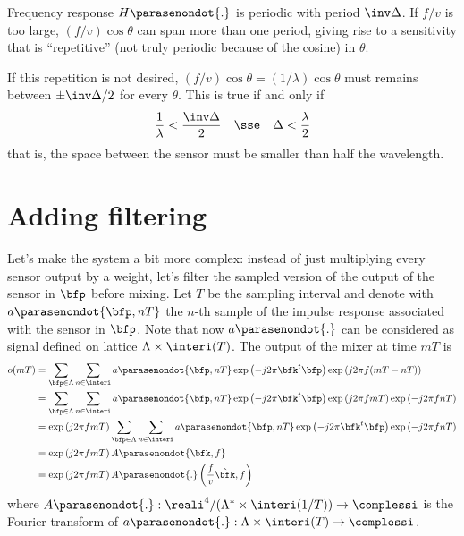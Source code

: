 \documentclass[11pt]{article}
\newcommand{\wv}{\bfk}
\newcommand{\wvn}{\hat\wv}
\newcommand{\x}[1][0]{\ifcase #1\bfp \or\bfq\else x#1\fi}
\newcommand{\out}[1][t]{o({#1})}
\newcommand{\Lcoeff}[1]{H\parasenondot{#1}}
\newcommand{\filt}[1][\x,nT]{a\parasenondot{#1}}
\newcommand{\Filt}[1][\wv,f]{A\parasenondot{#1}}
\begin{document}
\begin{commento}
  Frequency response $\Lcoeff.$ is periodic with period
  $\inv\Delta$. If $f/v$ is too large, $(f/v) \cos \theta$ can span
  more than one period, giving rise to a sensitivity that is
  ``repetitive'' (not truly periodic because of the cosine) in
  $\theta$.  
  
  If this repetition is not desired, $(f/v)\cos\theta= (1/\lambda)
  \cos\theta$ must remains between $\pm \inv\Delta/2$ for every
  $\theta$.  This is true if and only if
\begin{equation}
\label{eq:11;beamforming-notes}
\frac{1}{\lambda} < \frac{\inv\Delta}{2}
\quad \sse \quad
\Delta < \frac \lambda 2
\end{equation}
%
that is, the space between the sensor must be smaller than half the
wavelength. 
\end{commento}

\section{Adding filtering}
\label{sect:2;beamforming-notes}

Let's make the system a bit more complex: instead of just multiplying
every sensor output by a weight, let's filter the sampled version of
the output of the sensor in $\x$ before mixing.  Let $T$ be the
sampling interval and denote with $\filt$ the $n$-th sample of the
impulse response associated with the sensor in $\x$.  Note that now
$\filt[.]$ can be considered as signal defined on lattice $\Lambda
\times \interi(T)$.  The output of the mixer at time $mT$ is
%
\begin{equation}
\label{eq:13;beamforming-notes}
\begin{split}
  \out[mT]
  &= \sum_{\x \in\Lambda} \sum_{n \in \interi}  \filt
  \exp\left(-j 2\pi \wv^t\x \right)
    \exp\left(j 2\pi f(mT-nT)\right)\\
  &= \sum_{\x \in\Lambda} \sum_{n \in \interi}  \filt
  \exp\left(-j 2\pi \wv^t\x \right)
    \exp\left(j 2\pi fmT\right)
    \exp\left(-j 2\pi fnT\right)\\
  &=     \exp\left(j 2\pi fmT\right)
\sum_{\x \in\Lambda} \sum_{n \in \interi}  \filt
  \exp\left(-j 2\pi \wv^t\x \right)
    \exp\left(-j 2\pi fnT\right) \\
    &=     \exp\left(j 2\pi fmT\right) \Filt\\
    &=     \exp\left(j 2\pi fmT\right) \Filt[.]\left(\frac{f}{v}\wvn,f \right)
\end{split}
\end{equation}
%
where $\Filt[.] : \reali^4/(\Lambda^* \times \interi(1/T)) \to
\complessi$ is the Fourier transform of $\filt[.] : \Lambda \times
\interi(T) \to \complessi$.





\end{document}
